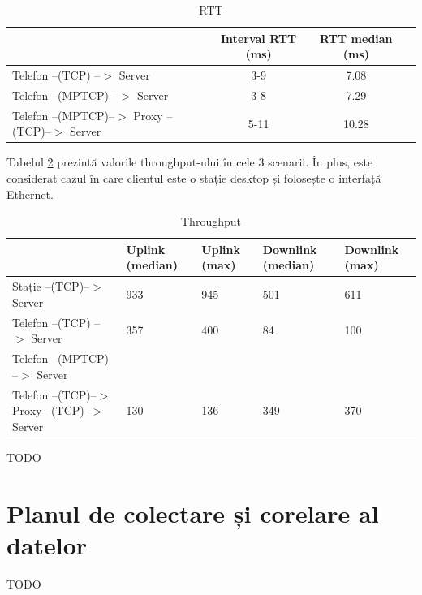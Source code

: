 \begin{table}[h]
\centering
\caption{RTT}
\label{tab:rtt}
\begin{tabular}{l | c c c}
\hline
& Interval RTT (ms)  & RTT median (ms) \\
\hline
Telefon --(TCP) --$>$ Server  & 3-9 &  7.08  \\
Telefon --(MPTCP) --$>$ Server  & 3-8  & 7.29 \\
Telefon --(MPTCP)--$>$ Proxy --(TCP)--$>$ Server & 5-11  & 10.28 \\
\hline
\end{tabular}
\end{table}

Tabelul \ref{tab:throughput} prezintă valorile throughput-ului în cele 3 scenarii. În plus, este considerat cazul în care clientul este o stație desktop și folosește o interfață Ethernet.

\begin{table}[h]
\centering
\caption{Throughput}
\label{tab:throughput}
\begin{tabular}{l | p{1.5cm} p{1.5cm} p{1.5cm} p{1.5cm}}
\hline
& Uplink (median) & Uplink (max) & Downlink (median) & Downlink (max) \\
\hline
Stație --(TCP)--$>$ Server & 933 & 945 & 501 & 611 \\
Telefon --(TCP) --$>$ Server & 357 & 400 & 84 & 100 \\
Telefon --(MPTCP) --$>$ Server & & & & \\
Telefon --(TCP)--$>$ Proxy --(TCP)--$>$ Server &  130 & 136 & 349 & 370 \\
\hline
\end{tabular}
\end{table}

TODO

\section{Planul de colectare și corelare al datelor}

TODO


